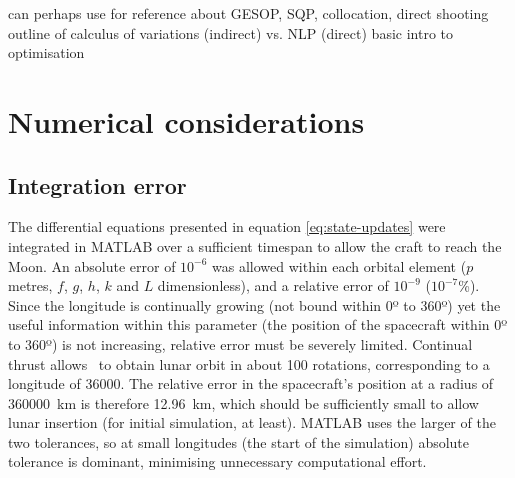 
can perhaps use \cite{Well2001} for reference about GESOP, SQP, collocation, direct shooting
\textcite{Enright1992} outline of calculus of variations (indirect) vs. NLP (direct)
\cite{Hughes2004}
\cite{Vasile2009}
\textcite{Nocedal2006} basic intro to optimisation






\section{Numerical considerations} \label{sec:Numerical-considerations}


\subsection{Integration error} \label{sub:Integration-error}

The differential equations presented in equation \eqref{eq:state-updates} were integrated in MATLAB over a sufficient timespan to allow the craft to reach the Moon. An absolute error of $10^{-6}$ was allowed within each orbital element ($p$ metres, $f$, $g$, $h$, $k$ and $L$ dimensionless), and a relative error of $10^{-9}$ ($10^{-7}$\%). Since the longitude is continually growing (not bound within 0º to 360º) yet the useful information within this parameter (the position of the spacecraft within 0º to 360º) is not increasing, relative error must be severely limited. Continual thrust allows \BW\ to obtain lunar orbit in about 100 rotations, corresponding to a longitude of 36000\degrees. The relative error in the spacecraft's position at a radius of 360000~km is therefore 12.96~km, which should be sufficiently small to allow lunar insertion (for initial simulation, at least). MATLAB uses the larger of the two tolerances, so at small longitudes (the start of the simulation) absolute tolerance is dominant, minimising unnecessary computational effort.

